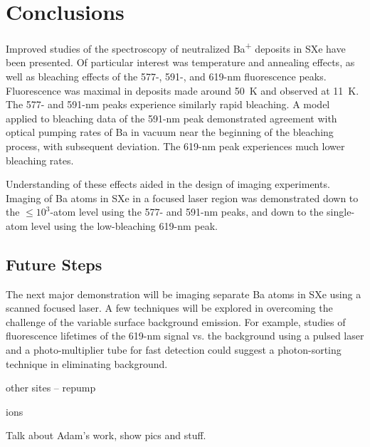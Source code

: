 \chapter{Conclusions}

Improved studies of the spectroscopy of neutralized Ba\textsuperscript{+} deposits in SXe have been presented.  Of particular interest was temperature and annealing effects, as well as bleaching effects of the 577-, 591-, and 619-nm fluorescence peaks.  Fluorescence was maximal in deposits made around 50~K and observed at 11~K.  The 577- and 591-nm peaks experience similarly rapid bleaching.  A model applied to bleaching data of the 591-nm peak demonstrated agreement with optical pumping rates of Ba in vacuum near the beginning of the bleaching process, with subsequent deviation.  The 619-nm peak experiences much lower bleaching rates.

Understanding of these effects aided in the design of imaging experiments.  Imaging of Ba atoms in SXe in a focused laser region was demonstrated down to the $\leq 10^{3}$-atom level using the 577- and 591-nm peaks, and down to the single-atom level using the low-bleaching 619-nm peak.

\section{Future Steps}

The next major demonstration will be imaging separate Ba atoms in SXe using a scanned focused laser.  A few techniques will be explored in overcoming the challenge of the variable surface background emission.  For example, studies of fluorescence lifetimes of the 619-nm signal vs. the background using a pulsed laser and a photo-multiplier tube for fast detection could suggest a photon-sorting technique in eliminating background.

other sites -- repump

ions

Talk about Adam's work, show pics and stuff.